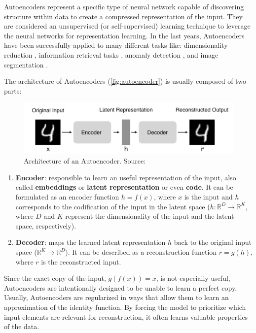 Autoencoders represent a specific type of neural network capable of discovering structure within data to create a compressed representation of the input. They are considered an unsupervised (or self-supervised) learning technique to leverage the neural networks for representation learning. In the last years, Autoencoders have been successfully applied to many different tasks like: dimensionality reduction \citep{petscharnig2017dimensionality, wang2015dimensionality}, information retrieval tasks \citep{pfeiffer2018neural}, anomaly detection \citep{sakurada2014anomaly}, and image segmentation \citep{baur2018deep, karimpouli2019segmentation}.

The architecture of Autoencoders (\autoref{fig:autoencoder}) is usually composed of two parts:

\begin{figure}[h]
\centering
\includegraphics[width=\linewidth]{images/autoencoder.png}
\caption{Architecture of an Autoencoder. Source: \citep{autoencoder_architecture}}
\label{fig:autoencoder}
\end{figure}

\begin{enumerate}
\item \textbf{Encoder}: responsible to learn an useful representation of the input, also called \textbf{embeddings} or \textbf{latent representation} or even \textbf{code}. It can be formulated as an encoder function $h = f(x)$, where $x$ is the input and $h$ corresponds to the codification of the input in the latent space ($h: \mathbb{R}^D \rightarrow \mathbb{R}^K$, where $D$ and $K$ represent the dimensionality of the input and the latent space, respectively).

\item \textbf{Decoder}: maps the learned latent representation $h$ back to the original input space ($\mathbb{R}^K \rightarrow \mathbb{R}^D$). It can be described as a reconstruction function $r = g(h)$, where $r$ is the reconstructed input.
\end{enumerate}

Since the exact copy of the input, $g(f(x)) = x$, is not especially useful, Autoencoders are intentionally designed to be unable to learn a perfect copy. Usually, Autoencoders are regularized in ways that allow them to learn an approximation of the identity function. By forcing the model to prioritize which input elements are relevant for reconstruction,  it often learns valuable properties of the data.

